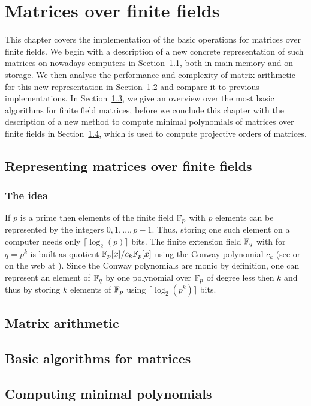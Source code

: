 
\chapter{Matrices over finite fields}

This chapter covers the implementation of the basic operations for matrices 
over finite fields. We begin with a description of a new concrete 
representation of such matrices on nowadays computers in 
Section~\ref{sec:ffematrices}, both in main memory and on storage.
We then analyse the performance and complexity of matrix arithmetic 
for this new representation in Section~\ref{sec:matarith} and compare
it to previous implementations. In Section~\ref{sec:basalgmat}, we give
an overview over the most basic algorithms for finite field matrices,
before we conclude this chapter with the description of a new method
to compute minimal polynomials of matrices over finite fields in
Section~\ref{sec:minpoly}, which is used to compute projective orders
of matrices.

\section{Representing matrices over finite fields}
\label{sec:ffematrices}

\subsection{The idea}

If $p$ is a prime then elements of the finite field $\mathbb{F}_p$ with $p$
elements can be represented by the integers $0, 1, \ldots, p-1$. Thus,
storing one such element on a computer needs only $\lceil \log_2(p)
\rceil$ bits. The finite extension field  $\mathbb{F}_q$ with for $q = p^k$ is built
as quotient $\mathbb{F}_p[x]/c_k \mathbb{F}_p[x]$ using the Conway polynomial
$c_k$ (see \cite{Nickel} or on the web at \cite{ConwayFL}). Since the
Conway polynomials are monic by definition, one can represent an element
of $\mathbb{F}_q$ by one polynomial over $\mathbb{F}_p$ of degree less then $k$ and thus
by storing $k$ elements of $\mathbb{F}_p$ using $\lceil \log_2(p^k) \rceil$ bits.



\section{Matrix arithmetic}
\label{sec:matarith}

\section{Basic algorithms for matrices}
\label{sec:basalgmat}

\section{Computing minimal polynomials}
\label{sec:minpoly}

